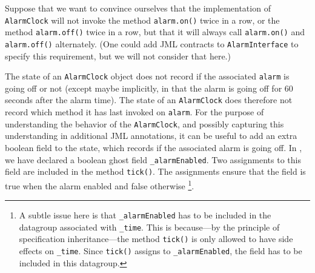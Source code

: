 \documentclass{llncs}
\begin{document}
% 
% 
% 
% 
% 

Suppose that we want to convince ourselves that the implementation of 
\texttt{AlarmClock} will not invoke the method \texttt{alarm.on()}
twice in a row, or the method \texttt{alarm.off()} twice in a row,
but that it will always call \texttt{alarm.on()} and \texttt{alarm.off()}
 alternately. 
(One could add JML contracts to \texttt{AlarmInterface} to specify this
requirement, but we will not consider that here.)

The state of an \texttt{AlarmClock} object does not record if the associated
\texttt{alarm} is going off or not (except maybe implicitly, in that the alarm is 
going off for 60 seconds after the alarm time). The state of an \texttt{AlarmClock}
does therefore not record which method it has last invoked on \texttt{alarm}.
For the purpose of understanding the behavior of the \texttt{AlarmClock}, 
and possibly capturing this understanding in additional JML annotations,
it can be useful to add an extra boolean field to the state, which records if 
the associated alarm is going off.
%
In , we have declared 
a boolean ghost field \texttt{\_alarmEnabled}.
Two assignments to this field are included in the method \texttt{tick()}.
The assignments ensure that the field is true when the alarm enabled and false
otherwise%
%
\footnote{A subtle issue here is that \texttt{\_alarmEnabled} has to be
  included in the datagroup associated with \texttt{\_time}. This is
  because---by the principle of specification inheritance---the method
  \texttt{tick()} is only allowed to have side effects on \texttt{\_time}.
  Since \texttt{tick()} assigns to \texttt{\_alarmEnabled}, the field
  has to be included in this datagroup.}.
\end{document}
